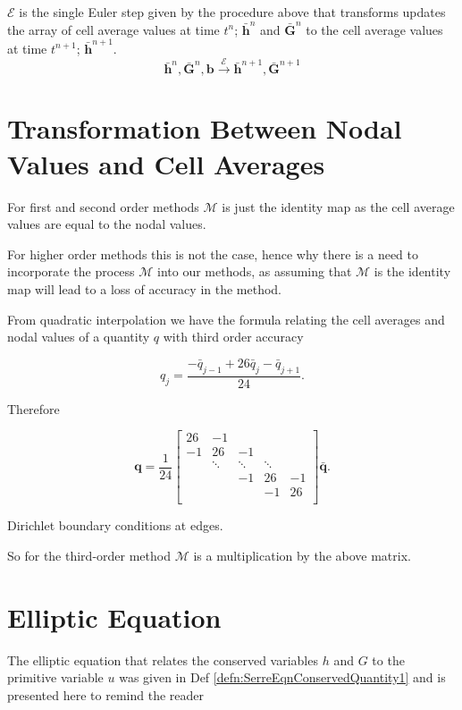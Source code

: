 \begin{defn}
	\label{defn:EulerStep}
	$\mathcal{E}$ is the single Euler step given by the procedure above that transforms updates the array of cell average values at time $t^n$; $\bar{\boldsymbol{h}}^n$ and $\bar{\boldsymbol{G}}^n$ to the cell average values at time $t^{n+1}$; $\bar{\boldsymbol{h}}^{n+ 1}$.
	$$\bar{\boldsymbol{h}}^n, \bar{\boldsymbol{G}}^n,  {\boldsymbol{b}} \xrightarrow{\mathcal{\mathcal{E}}}  \bar{\boldsymbol{h}}^{n+ 1}, \bar{\boldsymbol{G}}^{n+ 1}  $$
\end{defn}

\section{Transformation Between Nodal Values and Cell Averages}
For first and second order methods $\mathcal{M}$ is just the identity map as the cell average values are equal to the nodal values.

For higher order methods this is not the case, hence why there is a need to incorporate the process $\mathcal{M}$ into our methods, as assuming that $\mathcal{M}$ is the identity map will lead to a loss of accuracy in the method. 

From quadratic interpolation we have the formula relating the cell averages and nodal values of a quantity  $q$ with third order accuracy

\begin{equation*}
q_j = \frac{-\bar{q}_{j- 1} + 26\bar{q}_{j} - \bar{q}_{j + 1}}{24}.
\end{equation*}

Therefore 

\begin{equation*}
\boldsymbol{q} = \frac{1}{24}
\begin{bmatrix}
26  & -1  & & & \\
-1  & 26  & -1  &  & \\
 & \ddots & \ddots &  \ddots & \\
  &  & -1 & 26  &  -1\\
 &   &  & -1 & 26  \\
\end{bmatrix}
 \bar{\boldsymbol{q}}.
\end{equation*}

Dirichlet boundary conditions at edges.

So for the third-order method $\mathcal{M}$ is a multiplication by the above matrix. 

\section{Elliptic Equation}
The elliptic equation that relates the conserved variables $h$ and $G$ to the primitive variable $u$ was given in Def \ref{defn:SerreEqnConservedQuantity1} and is presented here to remind the reader

